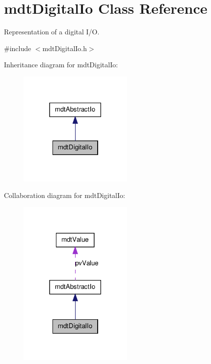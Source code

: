 \hypertarget{classmdt_digital_io}{
\section{mdtDigitalIo Class Reference}
\label{classmdt_digital_io}
}


Representation of a digital I/O.  




{\ttfamily \#include $<$mdtDigitalIo.h$>$}



Inheritance diagram for mdtDigitalIo:\nopagebreak
\begin{figure}[H]
\begin{center}
\leavevmode
\includegraphics[width=158pt]{classmdt_digital_io__inherit__graph}
\end{center}
\end{figure}


Collaboration diagram for mdtDigitalIo:\nopagebreak
\begin{figure}[H]
\begin{center}
\leavevmode
\includegraphics[width=158pt]{classmdt_digital_io__coll__graph}
\end{center}
\end{figure}
